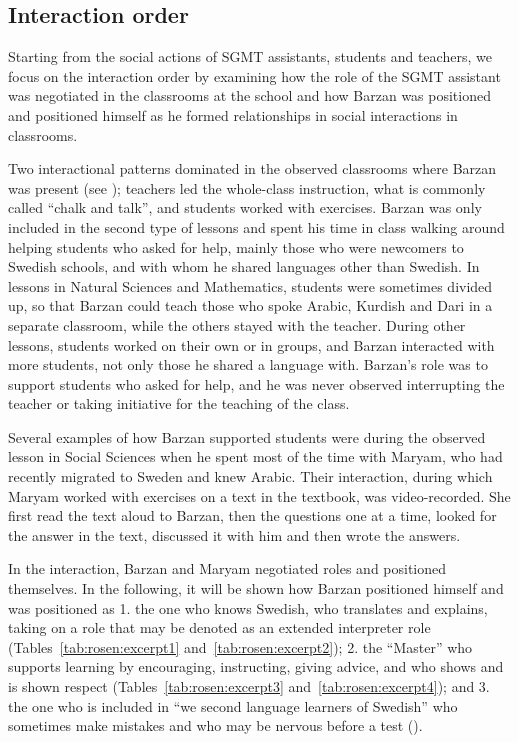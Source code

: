 \documentclass[output=paper]{langscibook}
\begin{document}
\subsection{Interaction order}\label{sec:rosen:4.1} %

Starting from the social actions of SGMT assistants, students and teachers, we focus on the interaction order by examining how the role of the SGMT assistant was negotiated in the classrooms at the school and how Barzan was positioned and positioned himself as he formed relationships in social interactions in classrooms.


Two interactional patterns dominated in the observed classrooms where Barzan was present (see \citealt{WedinAho2022}); teachers led the whole-class instruction, what is commonly called “chalk and talk”, and students worked with exercises. Barzan was only included in the second type of lessons and spent his time in class walking around helping students who asked for help, mainly those who were newcomers to Swedish schools, and with whom he shared languages other than Swedish. In lessons in Natural Sciences and Mathematics, students were sometimes divided up, so that Barzan could teach those who spoke Arabic, Kurdish and Dari in a separate classroom, while the others stayed with the teacher. During other lessons, students worked on their own or in groups, and Barzan interacted with more students, not only those he shared a language with. Barzan’s role was to support students who asked for help, and he was never observed interrupting the teacher or taking initiative for the teaching of the class.

Several examples of how Barzan supported students were during the observed lesson in Social Sciences when he spent most of the time with Maryam, who had recently migrated to Sweden and knew Arabic. Their interaction, during which Maryam worked with exercises on a text in the textbook, was video-recorded. She first read the text aloud to Barzan, then the questions one at a time, looked for the answer in the text, discussed it with him and then wrote the answers. 

In the interaction, Barzan and Maryam negotiated roles and positioned themselves. In the following, it will be shown how Barzan positioned himself and was positioned as 1. the one who knows Swedish, who translates and explains, taking on a role that may be denoted as an extended interpreter role (Tables~\ref{tab:rosen:excerpt1} and~\ref{tab:rosen:excerpt2}); 2. the “Master” who supports learning by encouraging, instructing, giving advice, and who shows and is shown respect (Tables~\ref{tab:rosen:excerpt3} and~\ref{tab:rosen:excerpt4}); and 3. the one who is included in “we second language learners of Swedish” who sometimes make mistakes and who may be nervous before a test ().
\end{document}
